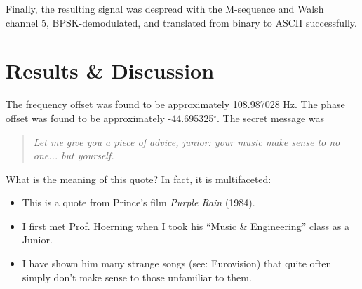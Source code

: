\documentclass[journal]{IEEEtran}
\begin{document}
Finally, the resulting signal was despread with the M-sequence and Walsh channel 5, BPSK-demodulated, and translated from binary to ASCII successfully.

\section{Results \& Discussion}
The frequency offset was found to be approximately 108.987028 Hz. The phase offset was found to be approximately -44.695325$^{\circ}$. The secret message was  
\begin{quote}
\emph{Let me give you a piece of advice, junior: your music make sense to no one... but yourself.}
\end{quote}

What is the meaning of this quote? In fact, it is multifaceted:
\begin{itemize}
\item This is a quote from Prince's film \emph{Purple Rain} (1984).
\item I first met Prof. Hoerning when I took his ``Music \& Engineering'' class as a Junior.
\item I have shown him many strange songs (see: Eurovision) that quite often simply don't make sense to those unfamiliar to them.
\end{itemize}


\end{document}
